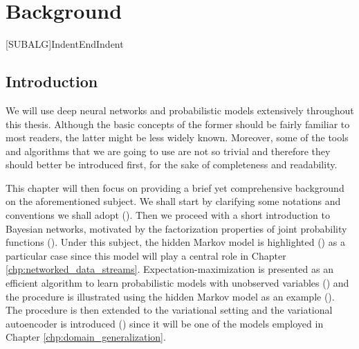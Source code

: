
\chapter{Background}


\label{chp:background}


[SUBALG]{Indent}{EndIndent}{}{\algorithmicend\ }%

\section{Introduction}
\label{sec:background_intro}
We will use deep neural networks and probabilistic models extensively throughout this thesis. Although the basic concepts of the former should be fairly familiar to most readers, the latter might be less widely known. Moreover, some of the tools and algorithms that we are going to use are not so trivial and therefore they should better be introduced first, for the sake of completeness and readability.

This chapter will then focus on providing a brief yet comprehensive background on the aforementioned subject. We shall start by clarifying some notations and conventions we shall adopt (). Then we proceed with a short introduction to Bayesian networks, motivated by the factorization properties of joint probability functions (). Under this subject, the hidden Markov model is highlighted () as a particular case since this model will play a central role in Chapter \ref{chp:networked_data_streams}. Expectation-maximization is presented as an efficient algorithm to learn probabilistic models with unobserved variables () and the procedure is illustrated using the hidden Markov model as an example (). The procedure is then extended to the variational setting and the variational autoencoder is introduced () since it will be one of the models employed in Chapter \ref{chp:domain_generalization}.

